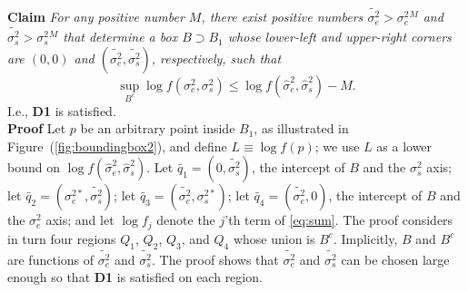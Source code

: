 \documentclass[ejs]{imsart}
\newcommand{\RL}{f}
\newcommand{\logRL}{\log\RL}
\newcommand{\sigssq}{\sigma_s^2}
\newcommand{\sigesq}{\sigma_e^2}
\newcommand{\sshat}{\hat\sigma^2_e,\hat\sigma^2_s}
\newcommand{\logRLss}{\logRL(\sigesq,\sigssq)}
\begin{document}
\noindent\textbf{Claim} \emph{For any positive number $M$, there exist positive numbers $\widetilde{\sigma_e^2} > \sigesq{}^M$ and $\widetilde{\sigma_s^2} > \sigssq{}^M$ that determine a box $B \supset B_1$ whose lower-left and upper-right corners are $(0,0)$ and $(\widetilde{\sigma_e^2}, \widetilde{\sigma_s^2})$, respectively, such that
\begin{equation*}
  \sup_{B^c} \logRLss \le \logRL(\sshat) - M.
\end{equation*}}
I.e., \textbf{D1} is satisfied.\\[5pt]
\noindent\textbf{Proof}
Let $p$ be an arbitrary point inside $B_1$, as illustrated in Figure~(\ref{fig:boundingbox2}), and define $L \equiv \logRL(p)$; we use $L$ as a lower bound on $\logRL(\sshat)$.  Let $\widetilde{q_1} = (0,\widetilde{\sigma_s^2})$, the intercept of $B$ and the $\sigssq$ axis; let $\widetilde{q_2} = (\sigma_e^{2*},\widetilde{\sigma_s^2})$; let $\widetilde{q_3} = (\widetilde{\sigma_e^2}, \sigma_s^{2*})$; let $\widetilde{q_4} = (\widetilde{\sigma_e^2},0)$, the intercept of $B$ and the $\sigesq$ axis; and let $\logRL_j$ denote the $j$'th term of \eqref{eq:sum}.  The proof considers in turn four regions $Q_1$, $Q_2$, $Q_3$, and $Q_4$ whose union is $B^c$.  Implicitly, $B$ and $B^c$ are functions of $\widetilde{\sigma_e^2}$ and $\widetilde{\sigma_s^2}$.  The proof shows that $\widetilde{\sigma_e^2}$ and $\widetilde{\sigma_s^2}$ can be chosen large enough so that \textbf{D1} is satisfied on each region.  
\end{document}
